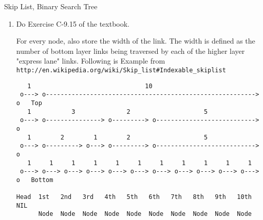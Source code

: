 \begin{homeworkProblem}{Skip List, Binary Search Tree}
    \begin{enumerate}[label=(\arabic*)]
        \item Do Exercise C-9.15 of the textbook.

            For every node, also store the width of the link. The width is 
            defined as the number of bottom layer links being traversed by each
            of the higher layer "express lane" links. Following is 
            Example from \texttt{http://en.wikipedia.org/wiki/Skip\_list\#Indexable\_skiplist}

    \begin{verbatim}
   1                               10
 o---> o---------------------------------------------------------> o   Top
   1           3              2                    5
 o---> o---------------> o---------> o---------------------------> o    
   1        2        1        2                    5
 o---> o---------> o---> o---------> o---------------------------> o   
   1     1     1     1     1     1     1     1     1     1     1 
 o---> o---> o---> o---> o---> o---> o---> o---> o---> o---> o---> o   Bottom
                                         
Head  1st   2nd   3rd   4th   5th   6th   7th   8th   9th   10th  NIL
      Node  Node  Node  Node  Node  Node  Node  Node  Node  Node
    \end{verbatim}


\end{enumerate}
\end{homeworkProblem}
